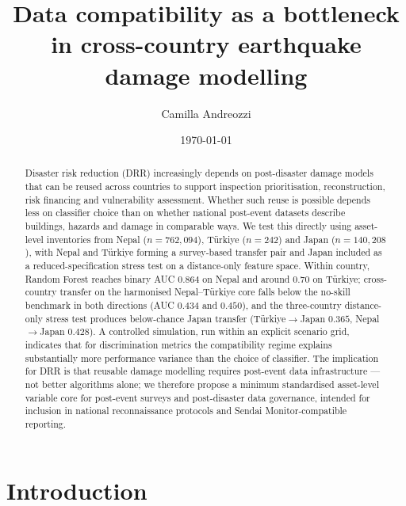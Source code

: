 \documentclass[11pt,a4paper]{article}
\title{\textbf{Data compatibility as a bottleneck in cross-country earthquake damage modelling}}
\author[1]{Camilla Andreozzi}
\affil[1]{\small Independent author. Correspondence: andreozzicamilla@gmail.com}
\date{\today}
\begin{document}
\maketitle


\begin{abstract}
\noindent
Disaster risk reduction (DRR) increasingly depends on post-disaster damage models that can be reused across countries to support inspection prioritisation, reconstruction, risk financing and vulnerability assessment. Whether such reuse is possible depends less on classifier choice than on whether national post-event datasets describe buildings, hazards and damage in comparable ways. We test this directly using asset-level inventories from Nepal ($n=762{,}094$), T\"urkiye ($n=242$) and Japan ($n=140{,}208$), with Nepal and T\"urkiye forming a survey-based transfer pair and Japan included as a reduced-specification stress test on a distance-only feature space. Within country, Random Forest reaches binary AUC $0.864$ on Nepal and around $0.70$ on T\"urkiye; cross-country transfer on the harmonised Nepal--T\"urkiye core falls below the no-skill benchmark in both directions (AUC $0.434$ and $0.450$), and the three-country distance-only stress test produces below-chance Japan transfer (T\"urkiye$\rightarrow$Japan $0.365$, Nepal$\rightarrow$Japan $0.428$). A controlled simulation, run within an explicit scenario grid, indicates that for discrimination metrics the compatibility regime explains substantially more performance variance than the choice of classifier. The implication for DRR is that reusable damage modelling requires post-event data infrastructure --- not better algorithms alone; we therefore propose a minimum standardised asset-level variable core for post-event surveys and post-disaster data governance, intended for inclusion in national reconnaissance protocols and Sendai Monitor-compatible reporting.
\end{abstract}
\newpage

\tableofcontents
\newpage

\section{Introduction}
\label{sec:intro}
\end{document}
